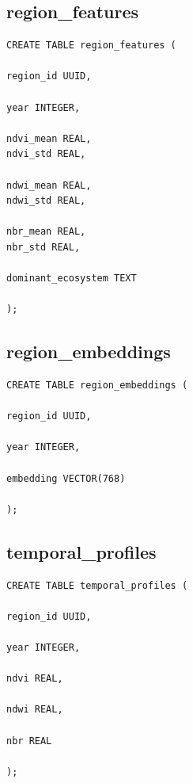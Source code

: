 \documentclass[11pt,a4paper]{article}
\begin{document}

\subsection{region_features}

\begin{verbatim}
CREATE TABLE region_features (

region_id UUID,

year INTEGER,

ndvi_mean REAL,
ndvi_std REAL,

ndwi_mean REAL,
ndwi_std REAL,

nbr_mean REAL,
nbr_std REAL,

dominant_ecosystem TEXT

);
\end{verbatim}


\subsection{region_embeddings}

\begin{verbatim}
CREATE TABLE region_embeddings (

region_id UUID,

year INTEGER,

embedding VECTOR(768)

);
\end{verbatim}


\subsection{temporal_profiles}

\begin{verbatim}
CREATE TABLE temporal_profiles (

region_id UUID,

year INTEGER,

ndvi REAL,

ndwi REAL,

nbr REAL

);
\end{verbatim}

\end{document}
